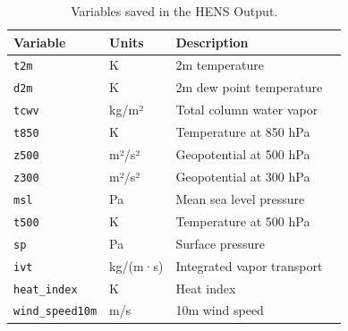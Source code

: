 \documentclass{article}
\begin{document}
\begin{table}[!h]
\caption{Variables saved in the HENS Output.}
\centering
\begin{tabular}{l l l c}
\hline
\textbf{Variable}          & \textbf{Units}            & \textbf{Description}                    \\ \hline
\texttt{t2m}               & K                        & 2m temperature                          \\
\texttt{d2m}               & K                        & 2m dew point temperature                \\ 
\texttt{tcwv}              & kg/m²                    & Total column water vapor                \\
\texttt{t850}              & K                        & Temperature at 850 hPa                  \\
\texttt{z500}              & m²/s²                    & Geopotential at 500 hPa                 \\
\texttt{z300}              & m²/s²                    & Geopotential at 300 hPa                 \\
\texttt{msl}               & Pa                       & Mean sea level pressure                 \\
\texttt{t500}              & K                        & Temperature at 500 hPa                  \\
\texttt{sp}                & Pa                       & Surface pressure                        \\
\texttt{ivt}               & kg/(m·s)                 & Integrated vapor transport              \\
\texttt{heat\_index}       & K                        & Heat index                              \\
\texttt{wind\_speed10m}       & m/s                      & 10m wind speed                          \\ \hline
\end{tabular}
\label{table:variables}
\end{table}
\end{document}
